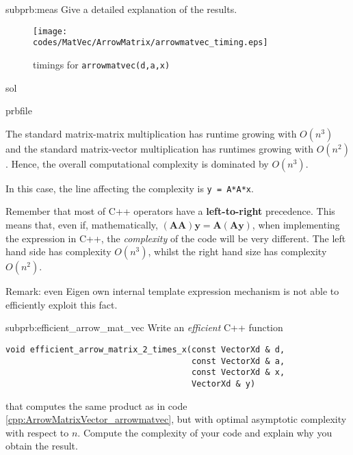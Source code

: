 \begin{samproblem}
\begin{subproblem}{subprb:meas}
  Give a detailed explanation of the results.

 \begin{figure}[ht]
   \centering
   \texttt{[image: \\codes/MatVec/ArrowMatrix/arrowmatvec\_timing.eps]}
   \caption{timings for \texttt{arrowmatvec(d,a,x)}}
   \label{fig:arrowmatvectiming}
 \end{figure}

 \begin{samwriteprbpart}{sol}
    \begin{writeverbatim}{prbfile}
      \begin{samsolution}
        The standard matrix-matrix multiplication has runtime growing with $O(n^3)$ and the standard
        matrix-vector multiplication has runtimes growing with $O(n^2)$. Hence, the overall
        computational complexity is dominated by $O(n^3)$.

        In this case, the line affecting the complexity is \texttt{y = A*A*x}.

        Remember that most of C++ operators have a \textbf{left-to-right} precedence. This means that,
        even if,
        mathematically, $(\mathbf{A} \mathbf{A}) \mathbf{y} = \mathbf{A} (\mathbf{A} \mathbf{y})$, when
        implementing the expression in C++, the \emph{complexity} of the code will be very different. The left hand
        side has complexity $O(n^3)$, whilst the right hand size has complexity $O(n^2)$.

        Remark: even Eigen own internal template expression mechanism is not
        able to efficiently exploit this fact.
      \end{samsolution}
    \end{writeverbatim}
  \end{samwriteprbpart}
\end{subproblem}

\begin{subproblem}{subprb:efficient_arrow_mat_vec}
Write an \emph{efficient} C++ function
\begin{verbatim}
void efficient_arrow_matrix_2_times_x(const VectorXd & d,
                                      const VectorXd & a,
                                      const VectorXd & x,
                                      VectorXd & y)
\end{verbatim}
that computes the same product as in code \ref{cpp:ArrowMatrixVector_arrowmatvec},
but with optimal asymptotic complexity with respect to {$n$}.
Compute the complexity of your code and
explain why you obtain the result.


\end{subproblem}
\end{samproblem}
